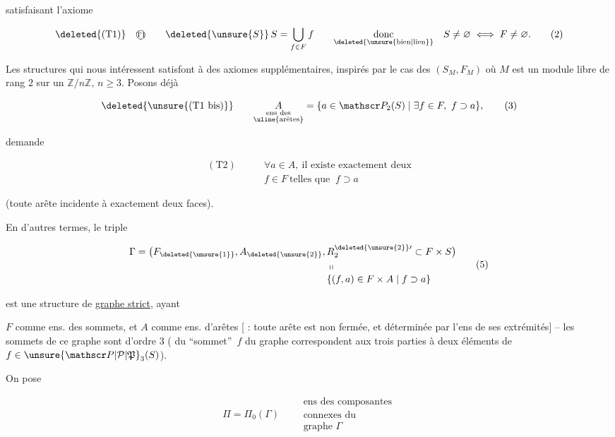 satisfaisant l'axiome

\[
\deleted{\text{(T1)}}\quad\text{\textcircled{\scriptsize T1}}\qquad\deleted{\unsure{S}}\,S=\bigcup_{f\in F}f
\qquad\underset{\deleted{\text{\unsure{bien|lien}}}}{\text{donc}}\quad S\ne\varnothing\iff F\ne\varnothing.\tag*{(2)}
\]

Les structures qui nous intéressent satisfont à des axiomes supplémentaires, inspirés par le cas des $(S_M,F_M)$ où $M$ est un module libre de rang $2$ sur un $\mathbb Z/n\mathbb Z$, $n\geq3$. Posons déjà

\[
\deleted{\text{\unsure{(T1 bis)}}}\qquad\underset{\substack{\text{ens des}\\\text{\uline{arêtes}}}}{A}=\{a\in\mathscr P_2(S)\mid\exists f\in F,\ f\supset a\},\tag*{(3)}
\]

 demande

\[
\begin{aligned}
 (\mathrm{T2})\qquad &\forall a\in A,\ \text{il existe exactement deux}\\
 &f\in F\ \text{telles que }\ f\supset a
\end{aligned}\tag*{(4)}
\]

(toute arête incidente à exactement deux faces).

En d'autres termes, le triple

\[
\begin{aligned}
 \Gamma=\bigl(F_{\deleted{\unsure{1}}},A_{\deleted{\unsure{2}}},{}&
 R_{2}^{\deleted{\unsure{2}}\prime}\subset F\times S\bigr)\\
 &\shortparallel\\[-2pt]
 &\{(f,a)\in F\times A\mid f\supset a\}
\end{aligned}\tag*{(5)}
\]

est une structure de \uline{graphe strict}, ayant

$F$ comme ens. des sommets, et $A$ comme ens. d'arêtes [ : toute arête est non fermée, et déterminée par l'ens de ses extrémités] --  les sommets de ce graphe sont d'ordre $3$ ( du ``sommet''\ $f$ du graphe correspondent aux trois parties à deux éléments de $f\in\unsure{\mathscr P|\mathcal P|\mathfrak P}_3(S)$).

On pose

\[
\Pi=\Pi_0(\Gamma)\qquad\substack{\text{ens des composantes}\\\text{connexes du}\\\text{graphe }\Gamma}\tag*{(6)}
\]

